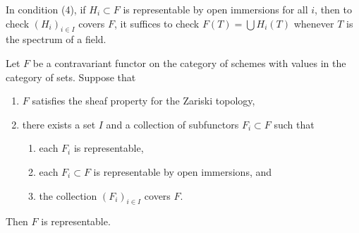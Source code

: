 \noindent
In condition (4), if $H_i \subset F$ is representable by open immersions
for all $i$, then to check $(H_i)_{i \in I}$ covers $F$, it suffices to
check $F(T) = \bigcup H_i(T)$ whenever $T$ is the spectrum of a field.

\begin{lemma}
\label{lemma-glue-functors}
Let $F$ be a contravariant functor on the category of schemes
with values in the category of sets. Suppose that
\begin{enumerate}
\item $F$ satisfies the sheaf property for the Zariski topology,
\item there exists a set $I$ and a collection of subfunctors
$F_i \subset F$ such that
\begin{enumerate}
\item each $F_i$ is representable,
\item each $F_i \subset F$ is representable by open immersions, and
\item the collection $(F_i)_{i \in I}$ covers $F$.
\end{enumerate}
\end{enumerate}
Then $F$ is representable.
\end{lemma}

